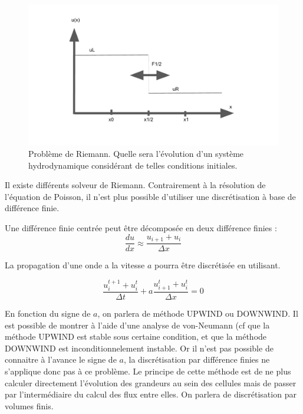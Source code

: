 
\begin{figure}
        \includegraphics[width=.95\linewidth]{img/02/riemann.pdf} 
        \caption[Problème de Riemann]{Problème de Riemann. Quelle sera l'évolution d'un système hydrodynamique considérant de telles conditions initiales.  
 		\label{fig:riemann}
 		}
\end{figure}

Il existe différents solveur de Riemann.
Contrairement à la résolution de l’équation de Poisson, il n'est plus possible d'utiliser une discrétisation à base de différence finie.

Une différence finie centrée peut être décomposée en deux différence finies : 
\begin{equation}
\frac{d u}{dx} \approx \frac{u_{i+1}  + u_i}{\Delta x} 
\end{equation}

La propagation d'une onde a la vitesse $a$ pourra être discrétisée en utilisant.

\begin{equation}
\frac{u_i^{t+1} + u_i^t }{\Delta t}   +a \frac{u_{i+1}^t  + u_i^t}{\Delta x} = 0
\end{equation}

En fonction du signe de $a$, on parlera de méthode UPWIND ou DOWNWIND.
Il est possible de montrer à l'aide d'une analyse de von-Neumann (cf \cite{toro1999riemann} que la méthode UPWIND est stable sous certaine condition, et que la méthode DOWNWIND est inconditionnelement instable.
Or il n'est pas possible de connaitre à l'avance le signe de $a$, la discrétisation par différence finies ne s'applique donc pas à ce problème. 
Le principe de cette méthode est de ne plus calculer directement l'évolution des grandeurs au sein des cellules mais de passer par l'intermédiaire du calcul des flux entre elles.
On parlera de discrétisation par volumes finis.




